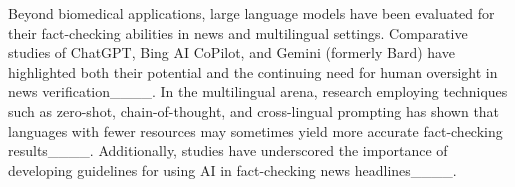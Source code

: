 Beyond biomedical applications, large language models have been evaluated for their fact-checking abilities in news and multilingual settings. Comparative studies of ChatGPT, Bing AI CoPilot, and Gemini (formerly Bard) have highlighted both their potential and the continuing need for human oversight in news verification____. In the multilingual arena, research employing techniques such as zero-shot, chain-of-thought, and cross-lingual prompting has shown that languages with fewer resources may sometimes yield more accurate fact-checking results____. Additionally, studies have underscored the importance of developing guidelines for using AI in fact-checking news headlines____.